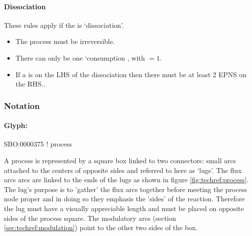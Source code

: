 \paragraph{Dissociation}

These rules apply if the  is `dissociation'.

\begin{itemize}
\item The process must be irreversible.
\item There can only be one `consumption , with
   $= 1$.
\item If a  is on the LHS of the dissociation then
  there must be at least 2 EPNS on the RHS..
\end{itemize}

\subsubsection{Notation}

\paragraph{Glyph: }
\label{sec:techref:process}

\begin{glyphDescription}

\glyphSboTerm SBO:0000375 ! process

\glyphNode A process is represented by a square box linked to two
connectors: small arcs attached to the centers of opposite sides and
referred to here as `lugs'. The
flux arcs arcs are linked to the ends of the lugs as shown in figure
\ref{fig:techref:process}. The lug's purpose is to 'gather' the flux arcs
together before meeting the process node proper and in doing so they
emphasis the 'sides' of the reaction. Therefore the lug must have a
visually appreciable length and must be placed on opposite sides
of the process square. The modulatory arcs (section
\ref{sec:techref:modulation}) point to the other two sides of the box.

\end{glyphDescription}

